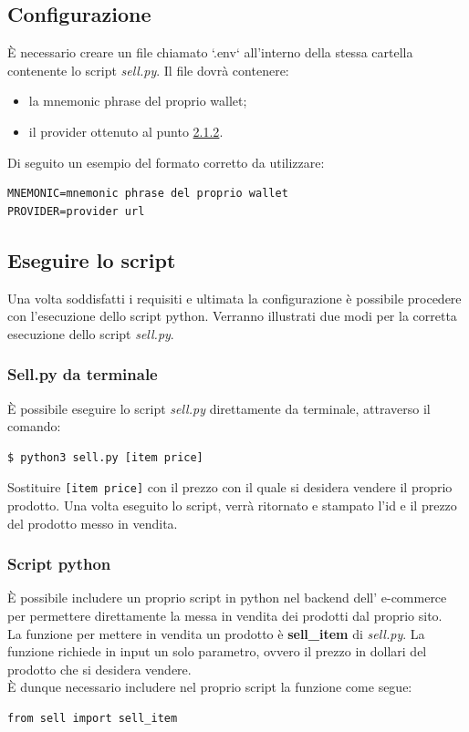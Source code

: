 \documentclass[a4paper, 12pt]{article}
\begin{document}
\subsection{Configurazione}
È necessario creare un file chiamato `.env` all'interno della stessa cartella contenente lo script \textit{sell.py}. Il file dovrà contenere:
\begin{itemize}
  \item la mnemonic phrase del proprio wallet;
  \item il provider ottenuto al punto \hyperref[sec:provider]{2.1.2}.
\end{itemize}
Di seguito un esempio del formato corretto da utilizzare:
\begin{verbatim}
MNEMONIC=mnemonic phrase del proprio wallet
PROVIDER=provider url
\end{verbatim}
\subsection{Eseguire lo script}
Una volta soddisfatti i requisiti e ultimata la configurazione è possibile procedere con l'esecuzione dello script python. Verranno illustrati due modi per la corretta esecuzione dello script \textit{sell.py}.
\subsubsection{Sell.py da terminale}
È possibile eseguire lo script \textit{sell.py} direttamente da terminale, attraverso il comando:
\begin{lstlisting}[language=bash]
  $ python3 sell.py [item price]
\end{lstlisting}
Sostituire \verb|[item price]| con il prezzo con il quale si desidera vendere il proprio prodotto.
Una volta eseguito lo script, verrà ritornato e stampato l'id e il prezzo del prodotto messo in vendita.
\subsubsection{Script python}
È possibile includere un proprio script in python nel backend dell' e-commerce per permettere direttamente la messa in vendita dei prodotti dal proprio sito.\\
La funzione per mettere in vendita un prodotto è \textbf{sell\_item} di \textit{sell.py}. La funzione richiede in input un solo parametro, ovvero il prezzo in dollari del prodotto che si desidera vendere.\\
È dunque necessario includere nel proprio script la funzione come segue:
\begin{verbatim}
from sell import sell_item
\end{verbatim}
\end{document}
